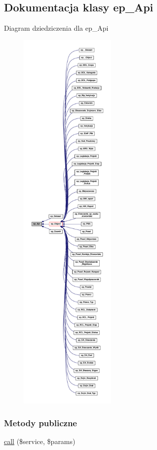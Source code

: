 \hypertarget{classep___api}{\subsection{Dokumentacja klasy ep\-\_\-\-Api}
\label{classep___api}
}


Diagram dziedziczenia dla ep\-\_\-\-Api\nopagebreak
\begin{figure}[H]
\begin{center}
\leavevmode
\includegraphics[height=550pt]{classep___api__inherit__graph}
\end{center}
\end{figure}
\subsubsection*{Metody publiczne}
\begin{DoxyCompactItemize}
\item 
\hyperlink{classep___api_a2d4655622385b620a6f18270d0026fd8}{call} (\$service, \$params)
\end{DoxyCompactItemize}
